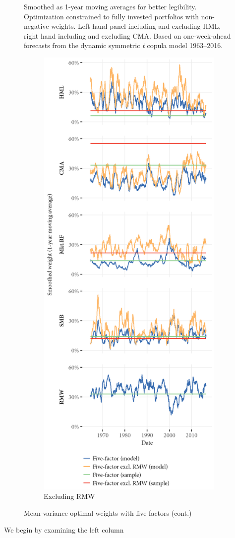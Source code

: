 \begin{figure}[htbp]
  \begin{longcaption}
    Smoothed as 1-year moving averages for better legibility. Optimization constrained to fully invested portfolios with non-negative weights. Left hand panel including and excluding HML, right hand including and excluding CMA. Based on one-week-ahead forecasts from the dynamic symmetric \emph{t} copula model 1963--2016.
  \end{longcaption}
\end{figure}

\begin{figure}[htbp]
  \ContinuedFloat
  \centering
  \begin{subfigure}{0.45\textwidth}
    \includegraphics[width=\textwidth]{graphics/weights/main_Weights_MV_5F_5F_EXCL_RMW.png}
    \caption{Excluding RMW}
  \end{subfigure}  
  \footnotesize
  \caption{Mean-variance optimal weights with five factors (cont.)}
\end{figure}

We begin by examining the left column 